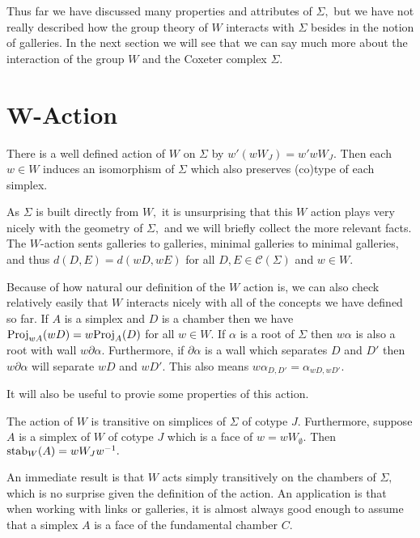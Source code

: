 \documentclass[class=book, crop=false,12 pt]{standalone}
\begin{document}
Thus far we have discussed many properties and attributes of $\Sigma,$ but we have not really described how the group theory of $W$ interacts with $\Sigma$ besides in the notion of galleries. In the next section we will see that we can say much more about the interaction of the group $W$ and the Coxeter complex $\Sigma.$

\section{W-Action}
\begin{prop}
	\label{prop:wact}
	There is a well defined action of $W$ on $\Sigma$ by $w'(wW_J)=w'wW_J.$ Then each $w\in W$ induces an isomorphism of $\Sigma$ which also preserves (co)type of each simplex.
\end{prop}

As $\Sigma$ is built directly from $W,$ it is unsurprising that this $W$ action plays very nicely with the geometry of $\Sigma,$ and we will briefly collect the more relevant facts. The $W$-action sents galleries to galleries, minimal galleries to minimal galleries, and thus $d(D,E)=d(wD,wE)$ for all $D,E\in \mathcal{C}(\Sigma)$ and $w\in W.$ 

Because of how natural our definition of the $W$ action is, we can also check relatively easily that $W$ interacts nicely with all of the concepts we have defined so far. If $A$ is a simplex and $D$ is a chamber then we have $\mathrm{Proj}_{wA}(wD)=w\mathrm{Proj}_{A}(D)$ for all $w\in W.$ If $\alpha$ is a root of $\Sigma$ then $w\alpha$ is also a root with wall $w\partial\alpha.$ Furthermore, if $\partial\alpha$ is a wall which separates $D$ and $D'$ then $w\partial\alpha$ will separate $wD$ and $wD'.$ This also means $w\alpha_{D,D'}=\alpha_{wD,wD'}.$ 

It will also be useful to provie some properties of this action.
\begin{theorem}
	\label{thm:stabW}
	The action of $W$ is transitive on simplices of $\Sigma$ of cotype $J.$ Furthermore, suppose $A$ is a simplex of $W$ of cotype $J$ which is a face of $w=wW_{\emptyset}.$ Then $\mathrm{stab}_W(A)=wW_Jw^{-1}.$
\end{theorem}

An immediate result is that $W$ acts simply transitively on the chambers of $\Sigma,$ which is no surprise given the definition of the action. An application is that when working with links or galleries, it is almost always good enough to assume that a simplex $A$ is a face of the fundamental chamber $C.$
\end{document}
